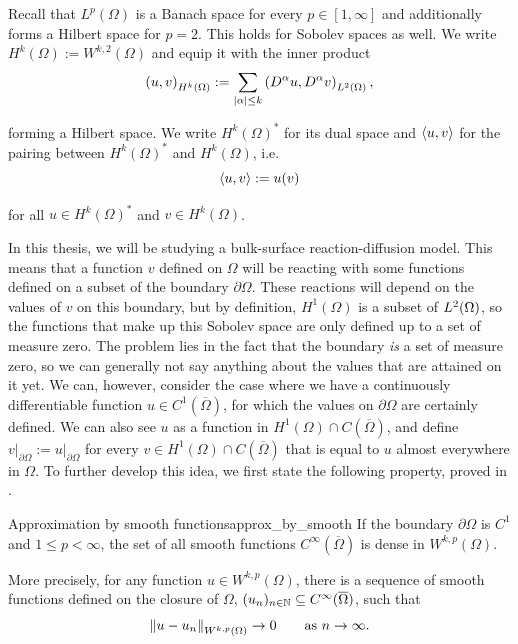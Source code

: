Recall that $L^p(\Omega)$ is a Banach space for every $p \in [1, \infty]$ and additionally forms a Hilbert space for $p = 2$. This holds for Sobolev spaces as well. We write $H^{k}(\Omega) := W^{k,2}(\Omega)$ and equip it with the inner product
%
\begin{equation*}
    \left( u, v \right)_{H^k(\Omega)} := \sum_{|\alpha| \leq k} \left( D^\alpha u, D^\alpha v \right)_{L^2(\Omega)} ,
\end{equation*}

\noindent
forming a Hilbert space. We write $H^k(\Omega)^*$ for its dual space and $\left\langle u, v \right\rangle$ for the pairing between $H^k(\Omega)^*$ and $H^{k}(\Omega)$, i.e.
%
\begin{equation*}
    \left\langle u, v \right\rangle := u(v)
\end{equation*}

\noindent
for all $u \in H^k(\Omega)^*$ and $v \in H^k(\Omega)$.

In this thesis, we will be studying a bulk-surface reaction-diffusion model. This means that a function $v$ defined on $\Omega$ will be reacting with some functions defined on a subset of the boundary $\partial \Omega$. These reactions will depend on the values of $v$ on this boundary, but by definition, $H^1(\Omega)$ is a subset of $L^2(\Omega)$, so the functions that make up this Sobolev space are only defined up to a set of measure zero. The problem lies in the fact that the boundary \emph{is} a set of measure zero, so we can generally not say anything about the values that are attained on it yet. We can, however, consider the case where we have a continuously differentiable function $u \in C^1(\overline{\Omega})$, for which the values on $\partial \Omega$ are certainly defined. We can also see $u$ as a function in $H^1(\Omega) \cap C(\overline{\Omega})$, and define $v \vert_{\partial \Omega} := u \vert_{\partial \Omega}$ for every $v \in H^1(\Omega) \cap C(\overline{\Omega})$ that is equal to $u$ almost everywhere in $\Omega$. To further develop this idea, we first state the following property, proved in \cite{evans2010partial}.

\begin{proposition}{Approximation by smooth functions}{approx_by_smooth}
    If the boundary $\partial \Omega$ is $C^1$ and $1 \leq p < \infty$, the set of all smooth functions $C^\infty(\overline{\Omega})$ is dense in $W^{k,p}(\Omega)$.
\end{proposition}

More precisely, for any function $u \in W^{k,p}(\Omega)$, there is a sequence of smooth functions defined on the closure of $\Omega$, $(u_n)_{n \in \mathbb{N}} \subseteq C^\infty(\overline{\Omega})$, such that
%
\begin{equation*}
    \left\| u - u_n \right\|_{W^{k,p}(\Omega)} \to 0 \qquad \text{as } n \to \infty.
\end{equation*}

